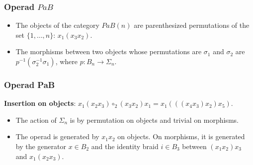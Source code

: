 \documentclass{beamer}
\theoremstyle{definition}
\begin{document}
\begin{frame}
	\frametitle{Operad $PaB$}
\begin{itemize}
	\item<1-> The objects of the category $PaB(n)$ are parenthesized permutations of the set $\{1,\dots, n\}$: $x_1(x_3x_2)$.
	\item<2-> The morphisms between two objects whose permutations are $\sigma_1$ and $\sigma_2$ are $p^{-1}(\sigma_2^{-1}\sigma_1)$, where $p:B_n\to \Sigma_n$. %
\end{itemize}
 \end{frame}
\begin{frame}
	\frametitle{Operad PaB}
	\textbf{Insertion on objects}: $x_1(x_2x_3)\circ_2(x_3x_2)x_1=x_1(((x_4x_3)x_2)x_5)$.
	

\begin{itemize}
	\item<3-> The action of $\Sigma_n$ is by permutation on objects and trivial on morphisms.
	\item<4-> The operad is generated by $x_1x_2$ on objects. On morphisms, it is generated by the generator $x\in B_2$ and the identity braid $i\in B_3$ between $(x_1x_2)x_3$ and $x_1(x_2x_3)$.
\end{itemize}
	
	
\end{frame}
\end{document}
